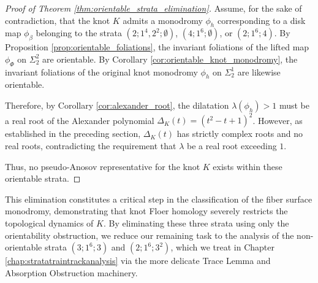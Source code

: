 \begin{proof}[Proof of Theorem \ref{thm:orientable_strata_elimination}]
Assume, for the sake of contradiction, that the knot $K$ admits a monodromy $\phi_h$ corresponding to a disk map $\phi_\beta$ belonging to the strata $(2; 1^4, 2^2; \emptyset)$, $(4; 1^6; \emptyset)$, or $(2; 1^6; 4)$. By Proposition \ref{prop:orientable_foliations}, the invariant foliations of the lifted map $\phi_\Phi$ on $\Sigma_2^2$ are orientable. By Corollary \ref{cor:orientable_knot_monodromy}, the invariant foliations of the original knot monodromy $\phi_h$ on $\Sigma_2^1$ are likewise orientable.

Therefore, by Corollary \ref{cor:alexander_root}, the dilatation $\lambda(\phi_h) > 1$ must be a real root of the Alexander polynomial $\Delta_K(t) = (t^2-t+1)^2$. However, as established in the preceding section, $\Delta_K(t)$ has strictly complex roots and no real roots, contradicting the requirement that $\lambda$ be a real root exceeding $1$.

Thus, no pseudo-Anosov representative for the knot $K$ exists within these orientable strata.
\end{proof}

This elimination constitutes a critical step in the classification of the fiber surface monodromy, demonstrating that knot Floer homology severely restricts the topological dynamics of $K$. By eliminating these three strata using only the orientability obstruction, we reduce our remaining task to the analysis of the non-orientable strata $(3;1^6;3)$ and $(2;1^6;3^2)$, which we treat in Chapter \ref{chap:stratatraintrackanalysis} via the more delicate Trace Lemma and Absorption Obstruction machinery.